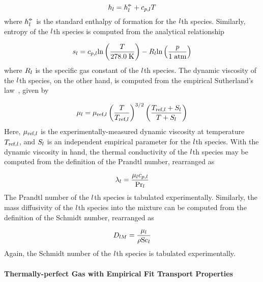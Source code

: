 \begin{equation}\label{eq:cpgEnthSpec}
	h_{l} = h^{\circ\kern-0.47em-}_{l} + c_{p,l} T
\end{equation}
where $h^{\circ\kern-0.47em-}_{l}$ is the standard enthalpy of formation for the $l$th species. Similarly, entropy of the $l$th species is computed from the analytical relationship

\begin{equation}\label{eq:cpgEntropySpec}
	s_{l} = c_{p,l} \text{ln}\left(\frac{T}{278.0 \; \text{K}}\right) - R_{l} \text{ln}\left(\frac{p}{1 \; \text{atm}}\right)
\end{equation}
where $R_{l}$ is the specific gas constant of the $l$th species. The dynamic viscosity of the $l$th species, on the other hand, is computed from the empirical Sutherland's law~\cite{Sutherland1893}, given by 

\begin{equation}\label{eq:viscSuthSpec}
	\mu_{l} = \mu_{\text{ref},l} \left( \frac{T}{T_{\text{ref},l}} \right)^{3/2} \left( \frac{T_{\text{ref},l} + S_{l}}{T + S_{l}} \right)
\end{equation}
Here, $\mu_{\text{ref},l}$ is the experimentally-measured dynamic viscosity at temperature $T_{\text{ref},l}$, and $S_{l}$ is an independent empirical parameter for the $l$th species. With the dynamic viscosity in hand, the thermal conductivity of the $l$th species may be computed from the definition of the Prandtl number, rearranged as

\begin{equation}\label{eq:cpgThermCondSpec}
	\lambda_{l} = \frac{\mu_{l} c_{p,l}}{\text{Pr}_{l}}
\end{equation}
The Prandtl number of the $l$th species is tabulated experimentally. Similarly, the mass diffusivity of the $l$th species into the mixture can be computed from the definition of the Schmidt number, rearranged as

\begin{equation}\label{eq:cpgMassDiffSpec}
	D_{l M} = \frac{\mu_{l}}{\rho \text{Sc}_{l}}
\end{equation}
Again, the Schmidt number of the $l$th species is tabulated experimentally.

\paragraph*{Thermally-perfect Gas with Empirical Fit Transport Properties}


